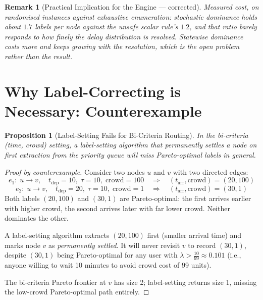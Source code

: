 \documentclass[11pt, a4paper]{article}
\newtheorem{proposition}[theorem]{Proposition}
\newtheorem{remark}[theorem]{Remark}
\theoremstyle{remark}
\newcommand{\crowd}{\mathrm{crowd}}
\begin{document}
\begin{remark}[Practical Implication for the Engine --- corrected]
    Measured cost, on randomised instances against exhaustive enumeration:
    stochastic dominance holds about $1.7$ labels per node against the unsafe
    scalar rule's $1.2$, and that ratio barely responds to how finely the delay
    distribution is resolved. Statewise dominance costs more and keeps growing
    with the resolution, which is the open problem rather than the result.
\end{remark}

\section{Why Label-Correcting is Necessary: Counterexample}

\begin{proposition}[Label-Setting Fails for Bi-Criteria Routing]
    \label{prop:label-setting-fails}
    In the bi-criteria (time, crowd) setting, a label-setting algorithm that
    \emph{permanently settles} a node on first extraction from the priority
    queue will miss Pareto-optimal labels in general.
\end{proposition}

\begin{proof}[Proof by counterexample]
    Consider two nodes $u$ and $v$ with two directed edges:
    \[
        e_1: \; u \to v, \quad t_{\text{dep}}=10, \; \tau=10, \; \crowd=100
        \quad \Rightarrow \quad (t_{\text{arr}}, \text{crowd}) = (20, 100)
    \]
    \[
        e_2: \; u \to v, \quad t_{\text{dep}}=20, \; \tau=10, \; \crowd=1
        \quad \Rightarrow \quad (t_{\text{arr}}, \text{crowd}) = (30, 1)
    \]
    Both labels $(20, 100)$ and $(30, 1)$ are Pareto-optimal: the first
    arrives earlier with higher crowd, the second arrives later with far
    lower crowd. Neither dominates the other.

    A label-setting algorithm extracts $(20, 100)$ first (smaller arrival
    time) and marks node $v$ as \emph{permanently settled}. It will never
    revisit $v$ to record $(30, 1)$, despite $(30, 1)$ being Pareto-optimal
    for any user with $\lambda > \frac{10}{99} \approx 0.101$
    (i.e., anyone willing to wait 10 minutes to avoid crowd cost of 99 units).

    The bi-criteria Pareto frontier at $v$ has size 2; label-setting returns
    size 1, missing the low-crowd Pareto-optimal path entirely.
\end{proof}
\end{document}
